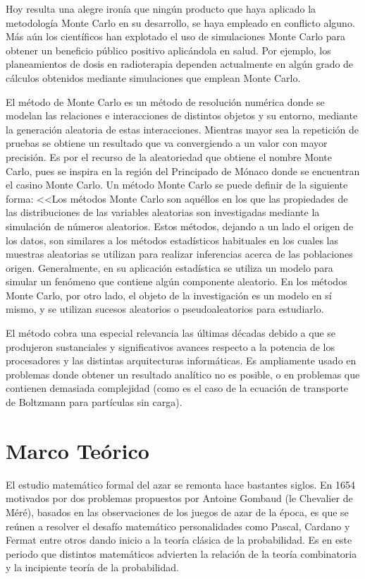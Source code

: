 \documentclass{rbf}
\begin{document}
Hoy resulta una alegre ironía que ningún producto que haya aplicado la metodología Monte Carlo en su desarrollo, se haya empleado en conflicto alguno. Más aún los científicos han explotado el uso de simulaciones Monte Carlo para obtener un beneficio público positivo aplicándola en salud. Por ejemplo, los planeamientos de dosis en radioterapia dependen actualmente en algún grado de cálculos obtenidos mediante simulaciones que emplean Monte Carlo.

El método de Monte Carlo es un método de resolución numérica donde se modelan las relaciones e interacciones de distintos objetos y su entorno, mediante la generación aleatoria de estas interacciones. Mientras mayor sea la repetición de pruebas se obtiene un resultado que va convergiendo a un valor con mayor precisión. Es por el recurso de la aleatoriedad que obtiene el nombre Monte Carlo, pues se inspira en la región del Principado de Mónaco donde se encuentran el casino Monte Carlo.
Un método Monte Carlo se puede definir de la siguiente forma: <<Los métodos Monte Carlo son aquéllos en los que las propiedades de las distribuciones de las variables aleatorias son investigadas mediante la simulación de números aleatorios. Estos métodos, dejando a un lado el origen de los datos, son similares a los métodos estadísticos habituales en los cuales las muestras aleatorias se utilizan para realizar inferencias acerca de las poblaciones origen. Generalmente, en su aplicación estadística se utiliza un modelo para simular un fenómeno que contiene algún componente aleatorio. En los métodos Monte Carlo, por otro lado, el objeto de la investigación es un modelo en sí mismo, y se utilizan sucesos aleatorios o pseudoaleatorios para estudiarlo.\cite{gent}


El método cobra una especial relevancia las últimas décadas debido a que se produjeron sustanciales y significativos avances respecto a la potencia de los procesadores y las distintas arquitecturas informáticas. Es ampliamente usado en problemas donde obtener un resultado analítico no es posible, o en problemas que contienen demasiada complejidad (como es el caso de la ecuación de transporte de Boltzmann para partículas sin carga).\cite{biela}
\section{Marco Teórico}
El estudio matemático formal del azar se remonta hace bastantes siglos. En 1654 motivados por dos problemas propuestos por Antoine Gombaud (le Chevalier de Méré), basados en las observaciones de los juegos de azar de la época, es que se reúnen a resolver el desafío matemático personalidades como Pascal, Cardano y Fermat entre otros dando inicio a la teoría clásica de la probabilidad. Es en este periodo que distintos matemáticos advierten la relación de la teoría combinatoria y la incipiente teoría de la probabilidad.
\end{document}
